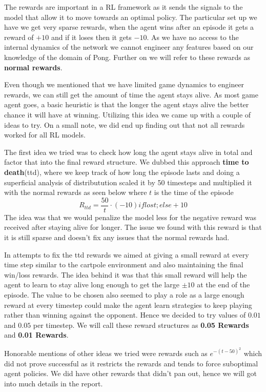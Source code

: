 The rewards are important in a RL framework as it sends the signals to the model that allow it to move towards an optimal policy. The particular set up we have we get very sparse rewards, when the agent wins after an episode it gets a reward of $+10$ and if it loses then it gets $-10$. As we have no access to the internal dynamics of the network we cannot engineer any features based on our knowledge of the domain of Pong. Further on we will refer to these rewards as \textbf{normal rewards}. 

\medskip
\noindent
Even though we mentioned that we have limited game dynamics to engineer rewards, we can still get the amount of time the agent stays alive. As most game agent goes, a basic heuristic is that the longer the agent stays alive the better chance it will have at winning. Utilizing this idea we came up with a couple of ideas to try. On a small note, we did end up finding out that not all rewards worked for all RL models.

\medskip
\noindent
The first idea we tried was to check how long the agent stays alive in total and factor that into the final reward structure. We dubbed this approach \textbf{time to death}(ttd), where we keep track of how long the episode lasts and doing a superficial analysis of distributution scaled it by 50 timesteps and multiplied it with the normal rewards as seen below where $t$ is the time of the episode
\[
    R_{ttd} = \frac{50}{t} \cdot  (-10) if lost; else +10 
\]
The idea was that we would penalize the model less for the negative reward was received after staying alive for longer. The issue we found with this reward is that it is still sparse and doesn't fix any issues that the normal rewards had.

\medskip
\noindent
In attempts to fix the ttd rewards we aimed at giving a small reward at every time step similar to the cartpole environment and also maintaining the final win/loss rewards. The idea behind it was that this small reward will help the agent to learn to stay alive long enough to get the large $\pm 10$ at the end of the episode. The value to be chosen also seemed to play a role as a large enough reward at every timestep could make the agent learn strategies to keep playing rather than winning against the opponent. Hence we decided to try values of $0.01$ and $0.05$ per timestep. We will call these reward structures as \textbf{0.05 Rewards} and \textbf{0.01 Rewards}. 

\medskip
\noindent
Honorable mentions of other ideas we tried were rewards such as $e^{-(t-50)^{2}}$ which did not prove successful as it restricts the rewards and tends to force suboptimal agent policies. We did have other rewards that didn't pan out, hence we will got into much details in the report.